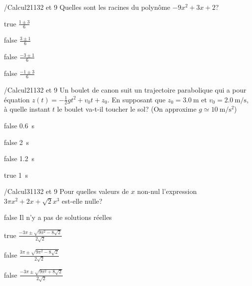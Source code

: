             \begin{question}{/}{Calcul}{2}{1132 et 9}
                Quelles sont les racines du polynôme $-9x^2+3x+2$?
            \end{question}
            \begin{reponses}
                \item[true] $\frac{1\pm 3}{6}$
                \item[false] $\frac{3 \pm 1}{6}$
                \item[false] $\frac{-3 \pm 1}{6}$
                \item[false] $\frac{-1 \pm 3}{6}$
            \end{reponses}
            \begin{question}{/}{Calcul}{2}{1132 et 9}
                Un boulet de canon suit un trajectoire parabolique qui a pour équation $z(t)=-\frac{1}{2}gt^2+v_0t+z_0$. En supposant que $z_0 = \SI{3.0}{\meter}$ et $v_0 = \SI{2.0}{\meter\per\second}$, à quelle instant $t$ le boulet va-t-il toucher le sol? (On approxime $g\simeq\SI{10}{\meter\per\second\squared}$)
            \end{question}
            \begin{reponses}
                \item[false] \SI{0.6}{\second}
                \item[false] \SI{2}{\second}
                \item[false] \SI{1.2}{\second}
                \item[true] \SI{1}{\second}
            \end{reponses}
        	\begin{question}{/}{Calcul}{3}{1132 et 9}
				Pour quelles valeurs de $x$ non-nul l'expression $3\pi x^2 + 2x + \sqrt{2}x^3$ est-elle nulle?
            \end{question}
            \begin{reponses}
            	\item[false] Il n'y a pas de solutions réelles
            	\item[true] $\frac{-3\pi \pm \sqrt{9\pi^2-8\sqrt{2}}}{2\sqrt{2}}$
                \item[false] $\frac{3\pi \pm \sqrt{9\pi^2-8\sqrt{2}}}{2\sqrt{2}}$
                \item[false] $\frac{-3\pi \pm \sqrt{9\pi^2+8\sqrt{2}}}{2\sqrt{2}}$
            \end{reponses}
